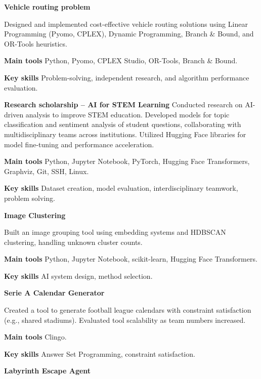 \documentclass[11pt]{article}
\begin{document}
\vspace{12pt}
\textbf{Vehicle routing problem}

Designed and implemented cost-effective vehicle routing solutions using Linear Programming (Pyomo, CPLEX), Dynamic Programming, Branch \& Bound, and OR-Tools heuristics.

 \textbf{Main tools}
Python, Pyomo, CPLEX Studio, OR-Tools, Branch \& Bound.

\textbf{Key skills}
Problem-solving, independent research, and algorithm performance evaluation.
\vspace{12pt}

\begin{samepage}
    \textbf{Research scholarship – AI for STEM Learning} 
    Conducted research on AI-driven analysis to improve STEM education. Developed models for topic classification and sentiment analysis of student questions, collaborating with multidisciplinary teams across institutions. Utilized Hugging Face libraries for model fine-tuning and performance acceleration.
    
    \textbf{Main tools}
    Python, Jupyter Notebook, PyTorch, Hugging Face Transformers, Graphviz, Git, SSH, Linux.
    
    \textbf{Key skills}
    Dataset creation, model evaluation, interdisciplinary teamwork, problem solving.
    \vspace{12pt}    
\end{samepage}

\textbf{Image Clustering}

Built an image grouping tool using embedding systems and HDBSCAN clustering, handling unknown cluster counts.

\textbf{Main tools}
Python, Jupyter Notebook, scikit-learn, Hugging Face Transformers.

\textbf{Key skills}
AI system design, method selection.
\vspace{12pt}

\textbf{Serie A Calendar Generator}

Created a tool to generate football league calendars with constraint satisfaction (e.g., shared stadiums). Evaluated tool scalability as team numbers increased.

\textbf{Main tools}
Clingo.

\textbf{Key skills}
Answer Set Programming, constraint satisfaction.
\vspace{12pt}

\textbf{Labyrinth Escape Agent}
\end{document}
